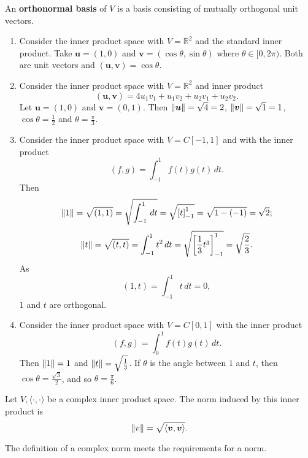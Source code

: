 \begin{definition}
    An \textbf{orthonormal basis} of $V$ is a basis consisting of mutually orthogonal unit vectors.
\end{definition}

\begin{example}
    \begin{enumerate}
        \item Consider the inner product space with $V = \mathbb{R}^2$ and the standard inner product. Take $\bm u = (1, 0)$ and $\bm v = (\cos{\theta}, \sin{\theta})$ where $\theta \in [0, 2\pi)$. Both are unit vectors and $(\bm u, \bm v) = \cos{\theta}$.
        \item Consider the inner product space with $V = \mathbb{R}^2$ and inner product \[ (\bm u, \bm v) = 4 u_1 v_1 + u_1 v_2 + u_2 v_1 + u_2 v_2. \] Let $\bm u = (1, 0)$ and $\bm v = (0, 1)$. Then $\lVert\bm u\rVert = \sqrt{4} = 2$, $\lVert\bm v\rVert = \sqrt{1} = 1$, $\cos{\theta} = \frac{1}{2}$ and $\theta = \frac{\pi}{3}$.
        \item Consider the inner product space with $V = C[-1, 1]$ and with the inner product \[ (f, g) = \int_{-1}^1 f(t) g(t) \, dt. \] Then \[ \lVert1\rVert = \sqrt{(1, 1)} = \sqrt{\int_{-1}^1 \, dt} = \sqrt{ \left[ t \right]^1_{-1}} = \sqrt{1 - (-1)} = \sqrt{2}; \] \[ \lVert t\rVert = \sqrt{(t, t)} = \int_{-1}^1 t^2 \, dt = \sqrt{ \left[ \frac{1}{3} t^3 \right]^1_{-1}} = \sqrt{\frac{2}{3}}. \] As \[ (1, t) = \int_{-1}^{1} t \, dt = 0, \] $1$ and $t$ are orthogonal.
        \item Consider the inner product space with $V = C[0, 1]$ with the inner product \[ (f, g) = \int_0^1 f(t) g(t) \, dt. \] Then $\lVert1\rVert = 1$ and $\lVert t\rVert = \sqrt{\frac{1}{3}}$. If $\theta$ is the angle between $1$ and $t$, then $\cos{\theta} = \frac{\sqrt{3}}{2}$, and so $\theta = \frac{\pi}{6}$.
    \end{enumerate}
\end{example}

\begin{definition}
    Let $V, \langle \cdot, \cdot \rangle$ be a complex inner product space. The norm induced by this inner product is \[ \lVert v\rVert = \sqrt{\langle \bm v, \bm v \rangle}. \]
\end{definition}

\begin{proposition}
    The definition of a complex norm meets the requirements for a norm.
\end{proposition}

